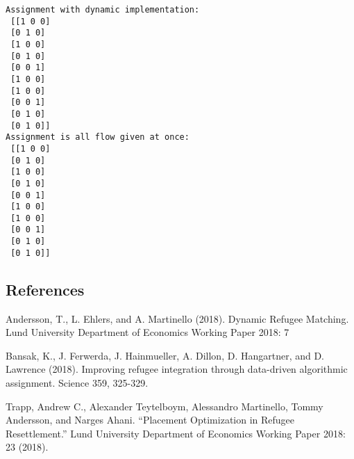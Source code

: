 \documentclass[11pt]{article}
\begin{document}
    \begin{Verbatim}[commandchars=\\\{\}]
Assignment with dynamic implementation:
 [[1 0 0]
 [0 1 0]
 [1 0 0]
 [0 1 0]
 [0 0 1]
 [1 0 0]
 [1 0 0]
 [0 0 1]
 [0 1 0]
 [0 1 0]]
Assignment is all flow given at once:  
 [[1 0 0]
 [0 1 0]
 [1 0 0]
 [0 1 0]
 [0 0 1]
 [1 0 0]
 [1 0 0]
 [0 0 1]
 [0 1 0]
 [0 1 0]]

    \end{Verbatim}

    \hypertarget{references}{%
\subsection{References}\label{references}}

Andersson, T., L. Ehlers, and A. Martinello (2018). Dynamic Refugee
Matching. Lund University Department of Economics Working Paper 2018: 7

Bansak, K., J. Ferwerda, J. Hainmueller, A. Dillon, D. Hangartner, and
D. Lawrence (2018). Improving refugee integration through data-driven
algorithmic assignment. Science 359, 325-329.

Trapp, Andrew C., Alexander Teytelboym, Alessandro Martinello, Tommy
Andersson, and Narges Ahani. ``Placement Optimization in Refugee
Resettlement.'' Lund University Department of Economics Working Paper
2018: 23 (2018).


    
    
    
    
\end{document}
